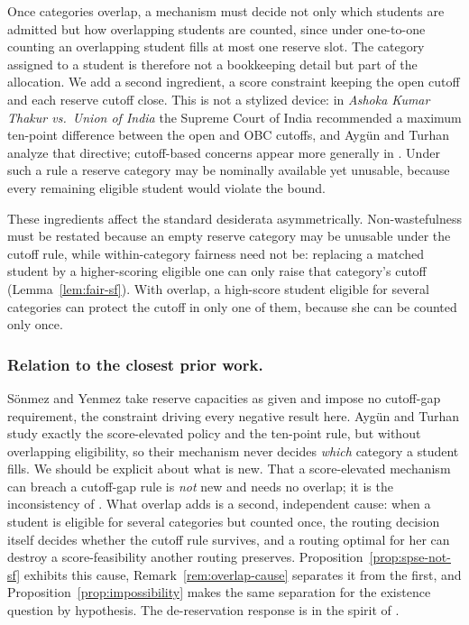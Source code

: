 \documentclass[runningheads]{llncs}
\begin{document}
Once categories overlap, a mechanism must decide not only which students are admitted but how overlapping students are counted, since under one-to-one counting an overlapping student fills at most one reserve slot. The category assigned to a student is therefore not a bookkeeping detail but part of the allocation. We add a second ingredient, a score constraint keeping the open cutoff and each reserve cutoff close. This is not a stylized device: in \emph{Ashoka Kumar Thakur vs.\ Union of India} the Supreme Court of India recommended a maximum ten-point difference between the open and OBC cutoffs, and Ayg\"un and Turhan \cite{AyTu23b} analyze that directive; cutoff-based concerns appear more generally in \cite{AyTu23a,ABB24a}. Under such a rule a reserve category may be nominally available yet unusable, because every remaining eligible student would violate the bound.

These ingredients affect the standard desiderata \cite{EHYY14a,KHIY17a,GKK+17a} asymmetrically. Non-wastefulness must be restated because an empty reserve category may be unusable under the cutoff rule, while within-category fairness need not be: replacing a matched student by a higher-scoring eligible one can only raise that category's cutoff (Lemma~\ref{lem:fair-sf}). With overlap, a high-score student eligible for several categories can protect the cutoff in only one of them, because she can be counted only once.

\subsubsection{Relation to the closest prior work.}
S\"onmez and Yenmez \cite{SoYe20a,SoYe22a} take reserve capacities as given and impose no cutoff-gap requirement, the constraint driving every negative result here. Ayg\"un and Turhan \cite{AyTu23b} study exactly the score-elevated policy and the ten-point rule, but without overlapping eligibility, so their mechanism never decides \emph{which} category a student fills. We should be explicit about what is new. That a score-elevated mechanism can breach a cutoff-gap rule is \emph{not} new and needs no overlap; it is the inconsistency of \cite{AyTu23b}. What overlap adds is a second, independent cause: when a student is eligible for several categories but counted once, the routing decision itself decides whether the cutoff rule survives, and a routing optimal for her can destroy a score-feasibility another routing preserves. Proposition~\ref{prop:spse-not-sf} exhibits this cause, Remark~\ref{rem:overlap-cause} separates it from the first, and Proposition~\ref{prop:impossibility} makes the same separation for the existence question by hypothesis. The de-reservation response is in the spirit of \cite{AyTu23a}.
\end{document}
